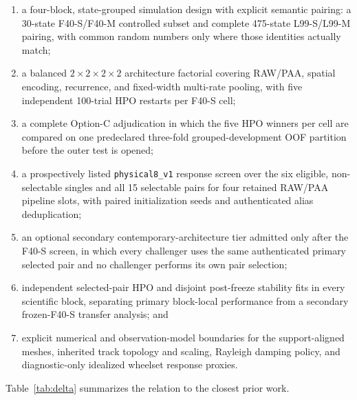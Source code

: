 \begin{enumerate}
  \item a four-block, state-grouped simulation design with explicit semantic
  pairing: a 30-state F40-S/F40-M controlled subset and complete
  475-state L99-S/L99-M pairing, with common random numbers only where those
  identities actually match;
  \item a balanced $2\times2\times2\times2$ architecture factorial covering
  RAW/PAA, spatial encoding, recurrence, and fixed-width multi-rate pooling,
  with five independent 100-trial HPO restarts per F40-S cell;
  \item a complete Option-C adjudication in which the five HPO winners per cell
  are compared on one predeclared three-fold grouped-development OOF partition
  before the outer test is opened;
  \item a prospectively listed \texttt{physical8\_v1} response screen over the
  six eligible, non-selectable singles and all 15 selectable pairs for four
  retained RAW/PAA pipeline slots, with paired initialization seeds and
  authenticated alias deduplication;
  \item an optional secondary contemporary-architecture tier admitted only
  after the F40-S screen, in which every challenger uses the same authenticated
  primary selected pair and no challenger performs its own pair selection;
  \item independent selected-pair HPO and disjoint post-freeze stability fits
  in every scientific block, separating primary block-local performance from a
  secondary frozen-F40-S transfer analysis; and
  \item explicit numerical and observation-model boundaries for the
  support-aligned meshes, inherited track topology and scaling, Rayleigh
  damping policy, and diagnostic-only idealized wheelset response proxies.
\end{enumerate}

Table~\ref{tab:delta} summarizes the relation to the closest prior work.

